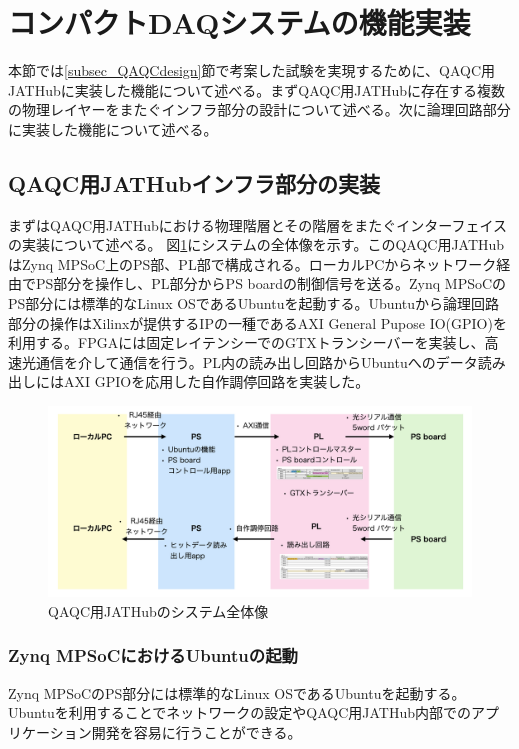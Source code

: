 \section{コンパクトDAQシステムの機能実装}
本節では\ref{subsec_QAQCdesign}節で考案した試験を実現するために、QAQC用JATHubに実装した機能について述べる。まずQAQC用JATHubに存在する複数の物理レイヤーをまたぐインフラ部分の設計について述べる。次に論理回路部分に実装した機能について述べる。

\subsection{QAQC用JATHubインフラ部分の実装}
\label{subsec_infra}
まずはQAQC用JATHubにおける物理階層とその階層をまたぐインターフェイスの実装について述べる。
図\ref{JAThubinfra}にシステムの全体像を示す。このQAQC用JATHubはZynq MPSoC上のPS部、PL部で構成される。ローカルPCからネットワーク経由でPS部分を操作し、PL部分からPS boardの制御信号を送る。Zynq MPSoCのPS部分には標準的なLinux OSであるUbuntuを起動する。Ubuntuから論理回路部分の操作はXilinxが提供するIPの一種であるAXI General Pupose IO(GPIO)を利用する。FPGAには固定レイテンシーでのGTXトランシーバーを実装し、高速光通信を介して通信を行う。PL内の読み出し回路からUbuntuへのデータ読み出しにはAXI GPIOを応用した自作調停回路を実装した。

\begin{figure} 
\centering
\includegraphics[width=16cm]{fig/QAQC/JAThubinfra.png}
\caption[QAQC用JATHubのシステム全体像]{QAQC用JATHubのシステム全体像}
\label{JAThubinfra}
\end{figure}

\subsubsection{Zynq MPSoCにおけるUbuntuの起動}
\label{subsubsec_ubuntu}
\baselineskip
Zynq MPSoCのPS部分には標準的なLinux OSであるUbuntuを起動する。Ubuntuを利用することでネットワークの設定やQAQC用JATHub内部でのアプリケーション開発を容易に行うことができる。\par

